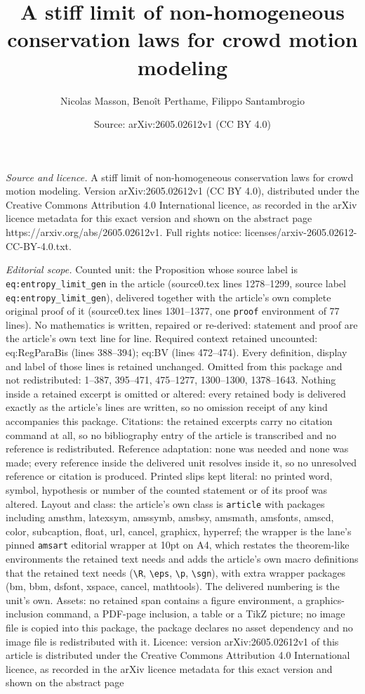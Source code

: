 \documentclass[10pt,a4paper]{amsart}
\title[A stiff limit of non-homogeneous conservation laws for crowd]{A stiff limit of non-homogeneous conservation laws for crowd motion modeling}
\author{Nicolas Masson, Beno\^it Perthame, Filippo Santambrogio}
\date{Source: arXiv:2605.02612v1 (CC BY 4.0)}
\begin{document}
\maketitle

\noindent\emph{Source and licence.} A stiff limit of non-homogeneous conservation laws for crowd motion modeling. Version arXiv:2605.02612v1 (CC BY 4.0), distributed under the Creative Commons Attribution 4.0 International licence, as recorded in the arXiv licence metadata for this exact version and shown on the abstract page https://arxiv.org/abs/2605.02612v1. Full rights notice: licenses/arxiv-2605.02612-CC-BY-4.0.txt.\par\smallskip

\noindent\textit{Editorial scope.} Counted unit: the Proposition whose source label is \texttt{eq:entropy\_limit\_gen} in the article (source0.tex lines 1278--1299, source label \texttt{eq:entropy\_limit\_gen}), delivered together with the article's own complete original proof of it (source0.tex lines 1301--1377, one \texttt{proof} environment of 77 lines). No mathematics is written, repaired or re-derived: statement and proof are the article's own text line for line. Required context retained uncounted: eq:RegParaBis (lines 388--394); eq:BV (lines 472--474). Every definition, display and label of those lines is retained unchanged. Omitted from this package and not redistributed: 1--387, 395--471, 475--1277, 1300--1300, 1378--1643. Nothing inside a retained excerpt is omitted or altered: every retained body is delivered exactly as the article's lines are written, so no omission receipt of any kind accompanies this package. Citations: the retained excerpts carry no citation command at all, so no bibliography entry of the article is transcribed and no reference is redistributed. Reference adaptation: none was needed and none was made; every reference inside the delivered unit resolves inside it, so no unresolved reference or citation is produced. Printed slips kept literal: no printed word, symbol, hypothesis or number of the counted statement or of its proof was altered. Layout and class: the article's own class is \texttt{article} with packages including amsthm, latexsym, amssymb, amsbsy, amsmath, amsfonts, amscd, color, subcaption, float, url, cancel, graphicx, hyperref; the wrapper is the lane's pinned \texttt{amsart} editorial wrapper at 10pt on A4, which restates the theorem-like environments the retained text needs and adds the article's own macro definitions that the retained text needs (\texttt{\textbackslash R}, \texttt{\textbackslash eps}, \texttt{\textbackslash p}, \texttt{\textbackslash sgn}), with extra wrapper packages (bm, bbm, dsfont, xspace, cancel, mathtools). The delivered numbering is the unit's own. Assets: no retained span contains a figure environment, a graphics-inclusion command, a PDF-page inclusion, a table or a TikZ picture; no image file is copied into this package, the package declares no asset dependency and no image file is redistributed with it. Licence: version arXiv:2605.02612v1 of this article is distributed under the Creative Commons Attribution 4.0 International licence, as recorded in the arXiv licence metadata for this exact version and shown on the abstract page 
\end{document}
